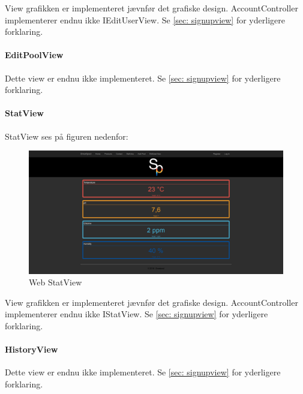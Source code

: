 View grafikken er implementeret jævnfør det grafiske design. AccountController implementerer endnu ikke IEditUserView. Se \ref{sec: signupview} for yderligere forklaring.

\paragraph{EditPoolView}
Dette view er endnu ikke implementeret. Se \ref{sec: signupview} for yderligere forklaring.

\paragraph{StatView}
StatView ses på figuren nedenfor:

\begin{figure}
	\centering
	\includegraphics[width=1.0\linewidth]{figs/implementering/web_statview}
	\caption{Web StatView}
	\label{fig:webstatview}
\end{figure}

View grafikken er implementeret jævnfør det grafiske design. AccountController implementerer endnu ikke IStatView. Se \ref{sec: signupview} for yderligere forklaring.

\paragraph{HistoryView}

Dette view er endnu ikke implementeret. Se \ref{sec: signupview} for yderligere forklaring.
